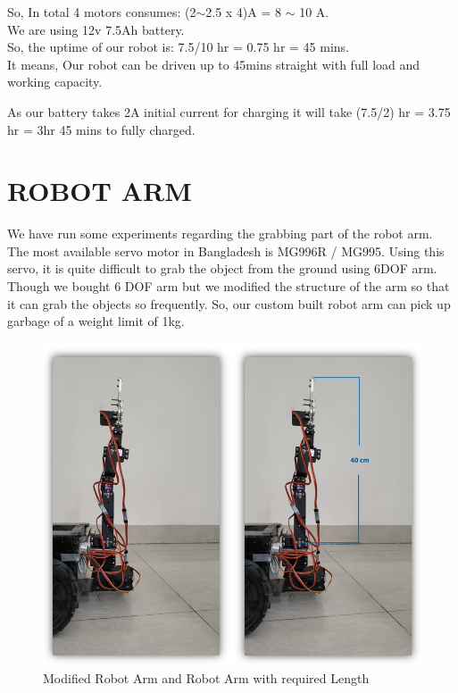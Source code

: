 \documentclass[conference]{IEEEtran}
\begin{document}
	So, In total 4 motors consumes: (2$\sim$2.5 x 4)A = 8 $\sim$ 10 A.
	\\We are using 12v 7.5Ah battery. 
	\\So, the uptime of our robot is: 7.5/10 hr = 0.75 hr = 45 mins.
	\\It means, Our robot can be driven up to 45mins straight with full load and working capacity. 
	
	As our battery takes 2A initial current for charging it will take (7.5/2) hr = 3.75 hr = 3hr 45 mins to fully charged. 	
	
	
	\section{ROBOT ARM}
	
	We have run some experiments regarding the grabbing part of the robot arm. The most available servo motor in Bangladesh is MG996R / MG995. Using this servo, it is quite difficult to grab the object from the ground using 6DOF arm. Though we bought 6 DOF arm but we modified the structure of the arm so that it can grab the objects so frequently. So, our custom built robot arm can pick up garbage of a weight limit of 1kg.
	
	\begin{figure}[htbp]
		\centerline{\includegraphics[scale=0.5]{arm.png}}
		\caption{Modified Robot Arm and Robot Arm with required Length}
		\label{fig}
	\end{figure}
	
\end{document}
